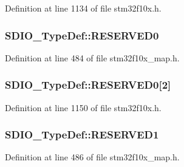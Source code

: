 Definition at line 1134 of file stm32f10x.\+h.

\subsubsection[{\texorpdfstring{R\+E\+S\+E\+R\+V\+E\+D0}{RESERVED0}}]{ S\+D\+I\+O\+\_\+\+Type\+Def\+::\+R\+E\+S\+E\+R\+V\+E\+D0}\hypertarget{struct_s_d_i_o___type_def_a27b652e67eded1e37029e127a9add747}{}\label{struct_s_d_i_o___type_def_a27b652e67eded1e37029e127a9add747}


Definition at line 484 of file stm32f10x\+\_\+map.\+h.

\subsubsection[{\texorpdfstring{R\+E\+S\+E\+R\+V\+E\+D0}{RESERVED0}}]{ S\+D\+I\+O\+\_\+\+Type\+Def\+::\+R\+E\+S\+E\+R\+V\+E\+D0\mbox{[}2\mbox{]}}\hypertarget{struct_s_d_i_o___type_def_a33cb9d9c17ad0f0c3071cac5e75297a9}{}\label{struct_s_d_i_o___type_def_a33cb9d9c17ad0f0c3071cac5e75297a9}


Definition at line 1150 of file stm32f10x.\+h.

\subsubsection[{\texorpdfstring{R\+E\+S\+E\+R\+V\+E\+D1}{RESERVED1}}]{ S\+D\+I\+O\+\_\+\+Type\+Def\+::\+R\+E\+S\+E\+R\+V\+E\+D1}\hypertarget{struct_s_d_i_o___type_def_ac1db196b42423d2a82369c846da9c25f}{}\label{struct_s_d_i_o___type_def_ac1db196b42423d2a82369c846da9c25f}


Definition at line 486 of file stm32f10x\+\_\+map.\+h.

